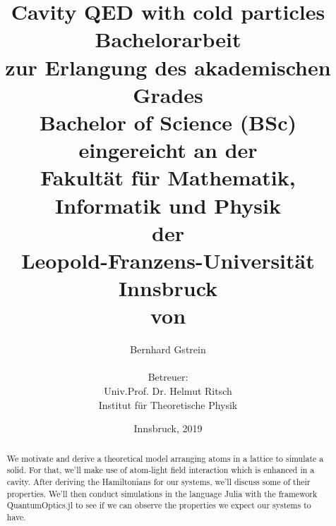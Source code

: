 \documentclass[a4paper,12pt]{article}
\begin{document}
%
    \title{Cavity QED with cold particles\\
    \vspace{2em}
    Bachelorarbeit\\
    \vspace{2em}
    \smaller[2]{}zur Erlangung des akademischen Grades\\
    Bachelor of Science (BSc)\\
    \vspace{2em}
    eingereicht an der\\
    Fakult{\"a}t f{\"u}r Mathematik, Informatik und Physik\\
    der\\
    Leopold-Franzens-Universit{\"a}t Innsbruck\\
    \vspace{1.5em}
    von}

    \author{
 	\LARGE Bernhard Gstrein\\
 	\vspace{.5em} \\
 	Betreuer:\\
 	Univ.Prof. Dr. Helmut Ritsch\\
 	\small Institut f{\"u}r Theoretische Physik\\
 	\vspace{1em}
	}
    
\date{Innsbruck, 2019}

\maketitle
   
\begin{abstract}
\noindent We motivate and derive a theoretical model arranging atoms in a lattice to simulate a solid. For that, we'll make use of atom-light field interaction which is enhanced in a cavity. After deriving the Hamiltonians for our systems, we'll discuss some of their properties. We'll then conduct simulations in the language Julia with the framework QuantumOptics.jl to see if we can observe the properties we expect our systems to have.
\end{abstract}
   
\newpage
   
\tableofcontents
 
\newpage
    







\newpage



\end{document}

